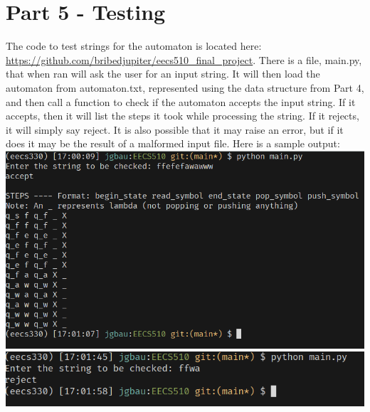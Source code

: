 \documentclass{article}
\begin{document}
\section{Part 5 - Testing}
The code to test strings for the automaton is located here:
\url{https://github.com/bribedjupiter/eecs510_final_project}. There is a file, main.py, that when ran will ask the user for an input string. It will then load the automaton from automaton.txt, represented using the data structure from Part 4, and then call a function to check if the automaton accepts the input string. If it accepts, then it will list the steps it took while processing the string. If it rejects, it will simply say reject. It is also possible that it may raise an error, but if it does it may be the result of a malformed input file. Here is a sample output:
\includegraphics[width=\textwidth]{part5-accept.png}
\includegraphics[width=\textwidth]{part5-reject.png}
\end{document}
